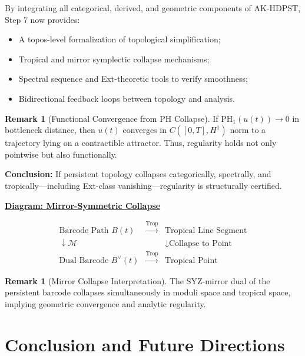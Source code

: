 \documentclass[11pt]{article}
\theoremstyle{definition}
\newtheorem{remark}[theorem]{Remark}
\begin{document}
By integrating all categorical, derived, and geometric components of AK-HDPST, Step 7 now provides:
\begin{itemize}
  \item A topos-level formalization of topological simplification;
  \item Tropical and mirror symplectic collapse mechanisms;
  \item Spectral sequence and Ext-theoretic tools to verify smoothness;
  \item Bidirectional feedback loops between topology and analysis.
\end{itemize}

\begin{remark}[Functional Convergence from PH Collapse]
If $\mathrm{PH}_1(u(t)) \to 0$ in bottleneck distance, then $u(t)$ converges in $C([0,T], H^1)$ norm to a trajectory lying on a contractible attractor. Thus, regularity holds not only pointwise but also functionally.
\end{remark}

\textbf{Conclusion:} If persistent topology collapses categorically, spectrally, and tropically---including Ext-class vanishing---regularity is structurally certified.

\begin{center}
\textbf{\underline{Diagram: Mirror-Symmetric Collapse}}
\end{center}
\[
\begin{array}{ccc}
\text{Barcode Path } B(t) & \xrightarrow{\text{Trop}} & \text{Tropical Line Segment} \\
\downarrow \mathcal{M} &  & \downarrow \text{Collapse to Point} \\
\text{Dual Barcode } B^\vee(t) & \xrightarrow{\text{Trop}} & \text{Tropical Point}
\end{array}
\]

\begin{remark}[Mirror Collapse Interpretation]
The SYZ-mirror dual of the persistent barcode collapses simultaneously in moduli space and tropical space, implying geometric convergence and analytic regularity.
\end{remark}




\section{Conclusion and Future Directions}
\end{document}
